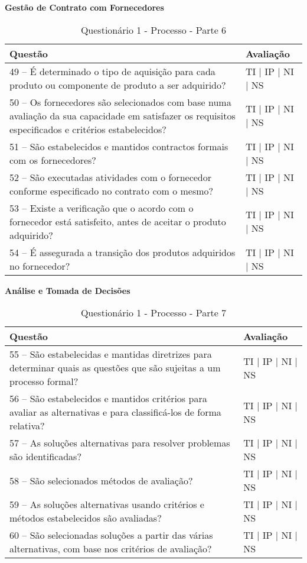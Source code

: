 \documentclass[openany,10pt,a4paper]{article}
\begin{document}
\begin{appendix}
\begin{table}[h]
\textbf{Gestão de Contrato com Fornecedores}
	\centering
	\caption{Questionário 1 - Processo - Parte 6}
	\begin{tabular}{p{3.5in}p{2in}}		
		\toprule
		\textbf{Questão}  & \textbf{Avaliação}\\ 
		\midrule
		49 – É determinado o tipo de aquisição para cada produto ou componente de produto a ser 
adquirido?
 & TI | IP | NI | NS \\
        \midrule
		50 – Os fornecedores são selecionados com base numa avaliação da sua capacidade em 
satisfazer os requisitos especificados e critérios estabelecidos?
 & TI | IP | NI | NS \\
		\midrule
		51 – São estabelecidos e mantidos contractos formais com os fornecedores?
 & TI | IP | NI | NS \\
		\midrule
        52 – São executadas atividades com o fornecedor conforme especificado no contrato com o 
mesmo?
 & TI | IP | NI | NS \\
		\midrule
		53 – Existe a verificação que o acordo com o fornecedor está satisfeito, antes de aceitar o 
produto adquirido?
  & TI | IP | NI | NS \\
		\midrule
		54 – É assegurada a transição dos produtos adquiridos no fornecedor?
 & TI | IP | NI | NS \\
		\bottomrule
	\end{tabular} 
	\label{tab:tabela1}
\end{table}

\begin{table}[h]
\textbf{Análise e Tomada de Decisões}
	\centering
	\caption{Questionário 1 - Processo - Parte 7}
	\begin{tabular}{p{3.5in}p{2in}}		
		\toprule
		\textbf{Questão}  & \textbf{Avaliação}\\ 
		\midrule
		55 – São estabelecidas e mantidas diretrizes para determinar quais as questões que são sujeitas 
a um processo formal?
 & TI | IP | NI | NS \\
        \midrule
		56 – São estabelecidos e mantidos critérios para avaliar as alternativas e para classificá-los de 
forma relativa?
 & TI | IP | NI | NS \\
		\midrule
		57 – As soluções alternativas para resolver problemas são identificadas?
 & TI | IP | NI | NS \\
		\midrule
        58 – São selecionados métodos de avaliação?
 & TI | IP | NI | NS \\
		\midrule
		59 – As soluções alternativas usando critérios e métodos estabelecidos são avaliadas?
  & TI | IP | NI | NS \\
		\midrule
		60 – São selecionadas soluções a partir das várias alternativas, com base nos critérios de 
avaliação?
 & TI | IP | NI | NS \\
		\bottomrule
	\end{tabular} 
	\label{tab:tabela1}
\end{table}


\end{appendix}
\end{document}
